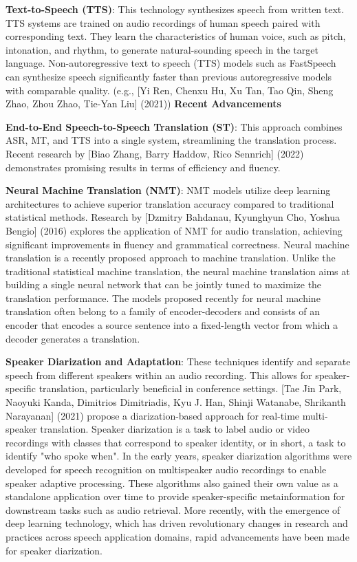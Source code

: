\documentclass[12px, a4paper]{article}
\begin{document}
\textbf{Text-to-Speech (TTS)}: This technology synthesizes speech from written text. TTS systems are trained on audio recordings of human speech paired with corresponding text. They learn the characteristics of human voice, such as pitch, intonation, and rhythm, to generate natural-sounding speech in the target language. Non-autoregressive text to speech (TTS) models such as FastSpeech can synthesize speech significantly faster than previous autoregressive models with comparable quality. (e.g., [Yi Ren, Chenxu Hu, Xu Tan, Tao Qin, Sheng Zhao, Zhou Zhao, Tie-Yan Liu] (2021)) \linebreak\linebreak
\textbf{Recent Advancements}

\textbf{End-to-End Speech-to-Speech Translation (ST)}: This approach combines ASR, MT, and TTS into a single system, streamlining the translation process. Recent research by [Biao Zhang, Barry Haddow, Rico Sennrich] (2022) demonstrates promising results in terms of efficiency and fluency.

\textbf{Neural Machine Translation (NMT)}: NMT models utilize deep learning architectures to achieve superior translation accuracy compared to traditional statistical methods. Research by [Dzmitry Bahdanau, Kyunghyun Cho, Yoshua Bengio] (2016) explores the application of NMT for audio translation, achieving significant improvements in fluency and grammatical correctness. Neural machine translation is a recently proposed approach to machine translation. Unlike the traditional statistical machine translation, the neural machine translation aims at building a single neural network that can be jointly tuned to maximize the translation performance. The models proposed recently for neural machine translation often belong to a family of encoder-decoders and consists of an encoder that encodes a source sentence into a fixed-length vector from which a decoder generates a translation.

\textbf{Speaker Diarization and Adaptation}: These techniques identify and separate speech from different speakers within an audio recording. This allows for speaker-specific translation, particularly beneficial in conference settings. [Tae Jin Park, Naoyuki Kanda, Dimitrios Dimitriadis, Kyu J. Han, Shinji Watanabe, Shrikanth Narayanan] (2021) propose a diarization-based approach for real-time multi-speaker translation. Speaker diarization is a task to label audio or video recordings with classes that correspond to speaker identity, or in short, a task to identify "who spoke when". In the early years, speaker diarization algorithms were developed for speech recognition on multispeaker audio recordings to enable speaker adaptive processing. These algorithms also gained their own value as a standalone application over time to provide speaker-specific metainformation for downstream tasks such as audio retrieval. More recently, with the emergence of deep learning technology, which has driven revolutionary changes in research and practices across speech application domains, rapid advancements have been made for speaker diarization. \linebreak\linebreak
\end{document}
